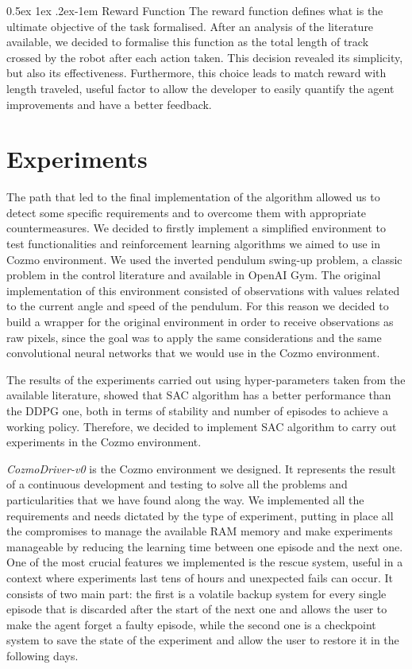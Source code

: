 \documentclass[10pt,twocolumn,letterpaper]{article}
\makeatletter
\renewcommand{\paragraph}{%
  \@startsection{paragraph}{4}%
  {\z@}{0.5ex \@plus 1ex \@minus .2ex}{-1em}%
  {\normalfont\normalsize\bfseries}%
}
\makeatother
\begin{document}
\paragraph{Reward Function} The reward function defines what is the ultimate objective of the task formalised. After an analysis of the literature available, we decided to formalise this function as the total length of track crossed by the robot after each action taken. This decision revealed its simplicity, but also its effectiveness. Furthermore, this choice leads to match reward with length traveled, useful factor to allow the developer to easily quantify the agent improvements and have a better feedback.

\section{Experiments}

The path that led to the final implementation of the algorithm allowed us to detect some specific requirements and to overcome them with appropriate countermeasures.
We decided to firstly implement a simplified environment to test functionalities and reinforcement learning algorithms we aimed to use in Cozmo environment. We used the inverted pendulum swing-up problem, a classic problem in the control literature and available in OpenAI Gym. 
The original implementation of this environment consisted of observations with values related to the current angle and speed of the pendulum. For this reason we decided to build a wrapper for the original environment in order to receive observations as raw pixels, since the goal was to apply the same considerations and the same convolutional neural networks that we would use in the Cozmo environment.

The results of the experiments carried out using hyper-parameters taken from the available literature, showed that SAC algorithm has a better performance than the DDPG one, both in terms of stability and number of episodes to achieve a working policy. Therefore, we decided to implement SAC algorithm to carry out experiments in the Cozmo environment.

\textit{CozmoDriver-v0} is the Cozmo environment we designed. It represents the result of a continuous development and testing to solve all the problems and particularities that we have found along the way. We implemented all the requirements and needs dictated by the type of experiment, putting in place all the compromises to manage the available RAM memory and make experiments manageable by reducing the learning time between one episode and the next one.
One of the most crucial features we implemented is the rescue system, useful in a context where experiments last tens of hours and unexpected fails can occur.
It consists of two main part: the first is a volatile backup system for every single episode that is discarded after the start of the next one and allows the user to make the agent forget a faulty episode, while the second one is a checkpoint system to save the state of the experiment and allow the user to restore it in the following days.
\end{document}

